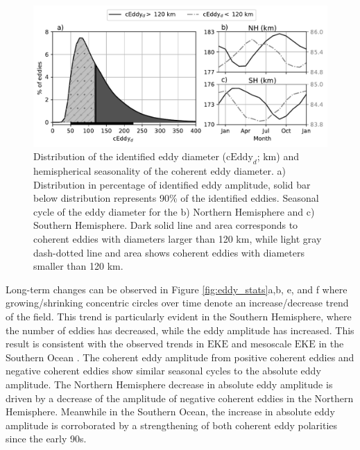 \documentclass[draft,linenumbers]{agujournal2019}
\newcommand{\EKE}{\textrm{EKE}}
\newcommand{\cEddy}{\textrm{cEddy}}
\begin{document}
	\begin{figure}
	    \centering
	    \includegraphics[width=1\textwidth]{figures/eddy_diameter_seasonal.pdf}
	    \caption{Distribution of the identified eddy diameter ($\cEddy_d$; km) and hemispherical seasonality of the coherent eddy diameter. a) Distribution in percentage of identified eddy amplitude, solid bar below distribution represents 90\% of the identified eddies. Seasonal cycle of the eddy diameter for the b) Northern Hemisphere and c) Southern Hemisphere. Dark solid line and area corresponds to coherent eddies with diameters larger than 120 km, while light gray dash-dotted line and area shows coherent eddies with diameters smaller than 120 km.}
	    \label{fig:eddy_diameter}
	\end{figure}

	Long-term changes can be observed in Figure \ref{fig:eddy_stats}a,b, e, and f where growing/shrinking concentric circles over time denote an increase/decrease trend of the field. 
	This trend is particularly evident in the Southern Hemisphere, where the number of eddies has decreased, while the eddy amplitude has increased. 
	This result is consistent with the observed trends in $\EKE$ and mesoscale $\EKE$ in the Southern Ocean \citep{Hogg_Recent_2015, Martinez_TKE_2019}. The coherent eddy amplitude from positive coherent eddies and negative coherent eddies show similar seasonal cycles to the absolute eddy amplitude. The Northern Hemisphere decrease in absolute eddy amplitude is driven by a decrease of the amplitude of negative coherent eddies in the Northern Hemisphere. Meanwhile in the Southern Ocean, the increase in absolute eddy amplitude is corroborated by a strengthening of both coherent eddy polarities since the early 90s.

\end{document}
